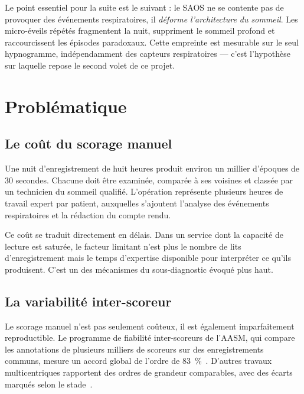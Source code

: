 Le point essentiel pour la suite est le suivant : le SAOS ne se contente pas de
provoquer des événements respiratoires, il \emph{déforme l'architecture du sommeil}.
Les micro-éveils répétés fragmentent la nuit, suppriment le sommeil profond et
raccourcissent les épisodes paradoxaux. Cette empreinte est mesurable sur le seul
hypnogramme, indépendamment des capteurs respiratoires — c'est l'hypothèse sur
laquelle repose le second volet de ce projet.

\section{Problématique}

\subsection{Le coût du scorage manuel}

Une nuit d'enregistrement de huit heures produit environ un millier d'époques de
30 secondes. Chacune doit être examinée, comparée à ses voisines et classée par un
technicien du sommeil qualifié. L'opération représente plusieurs heures de travail
expert par patient, auxquelles s'ajoutent l'analyse des événements respiratoires et
la rédaction du compte rendu.

Ce coût se traduit directement en délais. Dans un service dont la capacité de lecture
est saturée, le facteur limitant n'est plus le nombre de lits d'enregistrement mais le
temps d'expertise disponible pour interpréter ce qu'ils produisent. C'est un des
mécanismes du sous-diagnostic évoqué plus haut.

\subsection{La variabilité inter-scoreur}

Le scorage manuel n'est pas seulement coûteux, il est également imparfaitement
reproductible. Le programme de fiabilité inter-scoreurs de l'AASM, qui compare les
annotations de plusieurs milliers de scoreurs sur des enregistrements communs, mesure
un accord global de l'ordre de \SI{83}{\percent}~\cite{rosenberg2013}. D'autres
travaux multicentriques rapportent des ordres de grandeur comparables, avec des écarts
marqués selon le stade~\cite{danker2009}.

